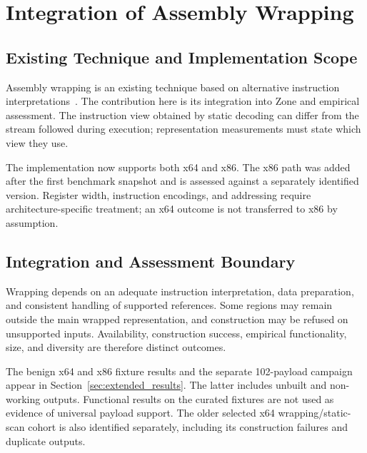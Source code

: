 \section{Integration of Assembly Wrapping}\label{sec:wrapping}
\subsection{Existing Technique and Implementation Scope}
Assembly wrapping is an existing technique based on alternative
instruction interpretations~\cite{assembly_wrapping}. The contribution
here is its integration into Zone and empirical assessment. The
instruction view obtained by static decoding can differ from the
stream followed during execution; representation measurements must
state which view they use.

The implementation now supports both x64 and x86. The x86 path was
added after the first benchmark snapshot and is assessed against a
separately identified version. Register width, instruction encodings,
and addressing require architecture-specific treatment; an x64 outcome
is not transferred to x86 by assumption.

\subsection{Integration and Assessment Boundary}
Wrapping depends on an adequate instruction interpretation, data
preparation, and consistent handling of supported references. Some
regions may remain outside the main wrapped representation, and
construction may be refused on unsupported inputs. Availability,
construction success, empirical functionality, size, and diversity
are therefore distinct outcomes.

The benign x64 and x86 fixture results and the separate 102-payload
campaign appear in Section~\ref{sec:extended_results}. The latter
includes unbuilt and non-working outputs. Functional results on the
curated fixtures are not used as evidence of universal payload support.
The older selected x64 wrapping/static-scan cohort is also identified
separately, including its construction failures and duplicate outputs.
